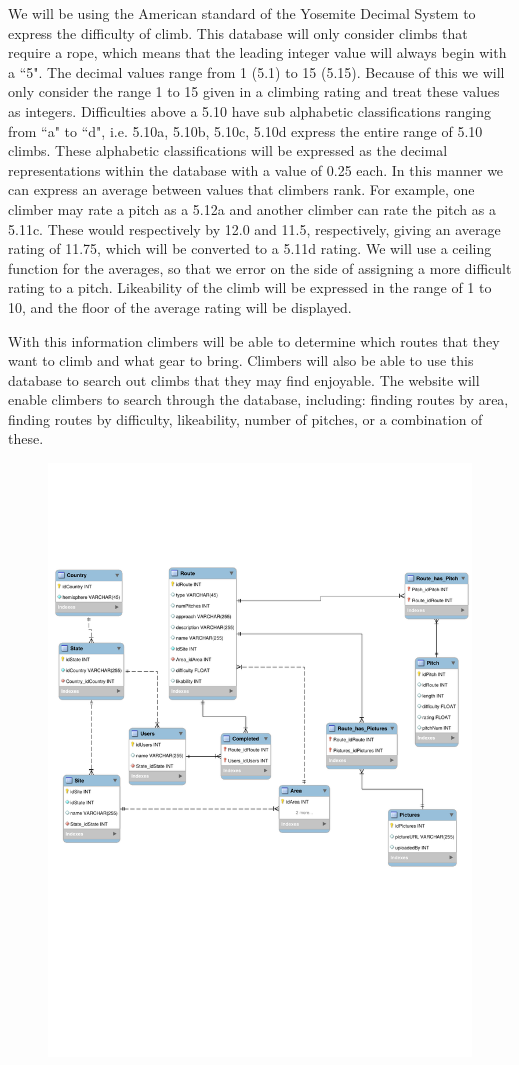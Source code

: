 \documentclass[12pt,letter]{article}
\begin{document}
We will be using the American standard of the Yosemite Decimal System to express
the difficulty of climb. This
database will only consider climbs that require a rope, which means that the
leading integer value will always begin with a ``5". The decimal values range
from 1 (5.1) to 15 (5.15). Because of this we will only consider the range 1 to
15 given in a climbing rating and treat these values as integers.  Difficulties
above a 5.10 have sub alphabetic classifications ranging from ``a" to ``d", i.e.
5.10a, 5.10b, 5.10c, 5.10d express the entire range of 5.10 climbs.  These
alphabetic classifications will be expressed as the decimal representations
within the database with a value of 0.25 each. In this manner we can express an
average between values that climbers rank. For example, one climber may rate a
pitch as a 5.12a and another climber can rate the pitch as a 5.11c. These would
respectively by 12.0 and 11.5, respectively, giving an average rating of 11.75,
which will be converted to a 5.11d rating. We will use a ceiling function for
the averages, so that we error on the side of assigning a more difficult rating
to a pitch. Likeability of the climb will be expressed in the range of 1 to 10,
and the floor of the average rating will be displayed.

With this information climbers will be able to determine which routes that they
want to climb and what gear to bring. Climbers will also be able to use this
database to search out climbs that they may find enjoyable. The website will
enable climbers to search through the database, including: finding routes by
area, finding routes by difficulty, likeability, number of pitches, or a
combination of these.

\FloatBarrier
\begin{figure}[ht!]
    \includegraphics[trim={0 8.5cm 0 4.5cm},clip, width=\textwidth]{ER_Diagram.pdf}
\end{figure}
\end{document}
